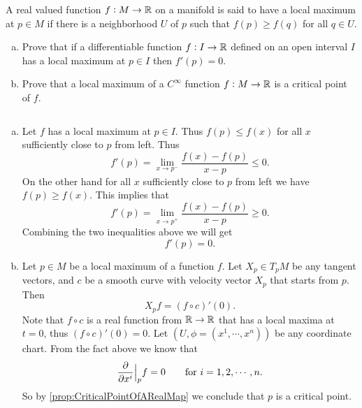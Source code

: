 \begin{problem}
	A real valued function $ f:M\to \mathbb{R} $ on a manifold is said to have a local maximum at $ p \in M $ if there is a neighborhood $ U $ of $ p $ such that $ f(p) \geq f(q) $ for all $ q \in U $.
	\begin{enumerate}[(a)]
		\item Prove that if a differentiable function $ f:I\to \mathbb{R} $ defined on an open interval $ I $ has a local maximum at $ p \in I $ then $ f'(p) = 0 $.
		\item Prove that a local maximum of a $ C^\infty $ function $ f:M\to \mathbb{R} $ is a critical point of $ f $.
	\end{enumerate}
\end{problem}
\begin{solution}
	$\ $
	\begin{enumerate}[(a)]
		\item Let $ f $ has a local maximum at $ p \in I $. Thus $ f(p) \leq f(x) $ for all $ x $ sufficiently close to $ p $ from left. Thus
		\[ f'(p) = \lim_{x \to p^-} \frac{f(x) - f(p)}{x-p} \leq 0. \]
		On the other hand for all $ x $ sufficiently close to $ p $ from left we have $ f(p) \geq f(x) $. This implies that 
		\[ f'(p) = \lim_{x \to p^+} \frac{f(x) - f(p)}{x-p} \geq 0. \]
		Combining the two inequalities above we will get
		\[ f'(p) = 0. \]
		\item Let $ p \in M $ be a local maximum of a function $ f $. Let $ X_p \in T_pM $ be any tangent vectors, and $ c $ be a smooth curve with velocity vector $ X_p $ that starts from $ p $. Then 
		\[ X_p f = (f\circ c)'(0). \]
		Note that $ f\circ c $ is a real function from $ \mathbb{R}\to \mathbb{R} $ that has a local maxima at $ t = 0 $, thus $ (f\circ c)'(0) = 0 $. Let $ (U,\phi = (x^1,\cdots,x^n)) $ be any coordinate chart. From the fact above we know that 
		\[ \frac{\partial}{\partial  x^i}\big|_{p} f = 0 \qquad \text{for $ i = 1,2,\cdots,n $}. \]
		So by \autoref{prop:CriticalPointOfARealMap} we conclude that $ p $ is a critical point.
	\end{enumerate}
\end{solution}